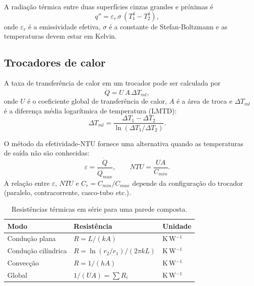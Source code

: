 \documentclass[12pt,a4paper]{article}
\numberwithin{equation}{section}
\numberwithin{table}{section}
\numberwithin{figure}{section}
\begin{document}
A radiação térmica entre duas superfícies cinzas grandes e próximas é
\begin{equation}\label{eq:v1-c5-6}
q'' = \varepsilon_r \, \sigma \, (T_1^4 - T_2^4),
\end{equation}
onde $\varepsilon_r$ é a emissividade efetiva, $\sigma$ é a constante de
Stefan-Boltzmann e as temperaturas devem estar em Kelvin.

\subsection{Trocadores de calor}

A taxa de transferência de calor em um trocador pode ser calculada por
\begin{equation}\label{eq:v1-c5-7}
\dot{Q} = U \, A \, \Delta T_{ml},
\end{equation}
onde $U$ é o coeficiente global de transferência de calor, $A$ é a área de
troca e $\Delta T_{ml}$ é a diferença média logarítmica de temperatura (LMTD):
\begin{equation}\label{eq:v1-c5-8}
\Delta T_{ml} = \frac{\Delta T_1 - \Delta T_2}{\ln(\Delta T_1 / \Delta T_2)}.
\end{equation}

O método da efetividade-NTU fornece uma alternativa quando as temperaturas de
saída não são conhecidas:
\begin{equation}\label{eq:v1-c5-9}
\varepsilon = \frac{\dot{Q}}{\dot{Q}_{max}}, \qquad
NTU = \frac{UA}{C_{min}}.
\end{equation}
A relação entre $\varepsilon$, $NTU$ e $C_r = C_{min}/C_{max}$ depende da
configuração do trocador (paralelo, contracorrente, casco-tubo etc.).

\begin{table}[H]
\centering
\caption{Resistências térmicas em série para uma parede composta.}
\label{tab:v1-c5-1}
\begin{tabular}{@{}lll@{}}
\toprule
\textbf{Modo} & \textbf{Resistência} & \textbf{Unidade} \\
\midrule
Condução plana & $R = L/(kA)$ & K\,W$^{-1}$ \\
Condução cilíndrica & $R = \ln(r_2/r_1)/(2\pi k L)$ & K\,W$^{-1}$ \\
Convecção & $R = 1/(hA)$ & K\,W$^{-1}$ \\
Global & $1/(UA) = \sum R_i$ & K\,W$^{-1}$ \\
\bottomrule
\end{tabular}
\end{table}
\end{document}
